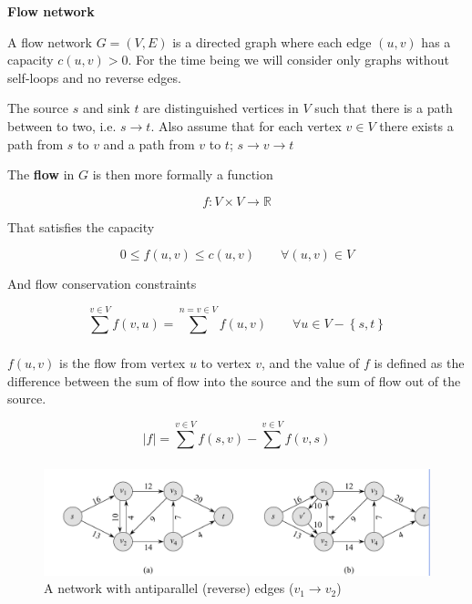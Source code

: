 \documentclass[../notes.tex]{subfiles}
\begin{document}
\begin{definition}
	\textbf{Flow network} 

	A flow network $ G = (V, E)$ is a directed graph where each edge $ (u,v) $ has a capacity $ c(u,v) > 0 $. 
	For the time being we will consider only graphs without self-loops and no reverse edges.

	The source $ s $ and sink $ t $ are distinguished vertices in $ V $ such that there is a path between to two, i.e. $ s \to t $. 
	Also assume that for each vertex $ v \in V$ there exists a path from $ s $ to $ v $ and a path from $ v $ to $ t $; $ s \to v \to t $


	The \textbf{flow} in $ G $ is then more formally a function

	\begin{equation}
		f: V \times V \to \mathbb{R}
	\end{equation}

	That satisfies the capacity 

	\begin{equation}
  0  \le f(u,v) \le  c(u,v) \qquad \forall (u,v) \in V
	\end{equation}

	
	And flow conservation constraints

	\begin{equation}
		\sum_{}^{v\in V} f(v, u) = \sum_{}^{n=v\in V} f(u, v) \qquad \forall u \in V - \left\{ s, t \right\} 
	\end{equation}


	$ f(u,v) $ is the flow from vertex $ u $ to vertex $ v $, and the value of $ f $ is defined as the difference between the sum of flow into the source and the sum of flow out of the source.

	\begin{equation}
		|f| = \sum_{}^{v\in V} f(s, v) - \sum_{}^{v\in V} f(v, s)
	\end{equation}
	
\end{definition}




\begin{figure}[H]
	\centering
	\includegraphics[width=0.8\linewidth]{img/image_2022-11-18-14-50-34.png}
	\caption{A network with antiparallel (reverse) edges ($ v_1 \to v_2 $)}
	\label{fig:358:antiparallel}
\end{figure}
\end{document}
